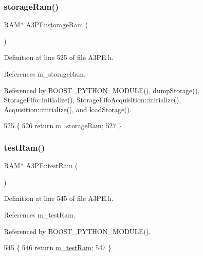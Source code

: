 \subsubsection{\texorpdfstring{storage\+Ram()}{storageRam()}}
{\footnotesize\ttfamily \hyperlink{classRAM}{R\+AM}$\ast$ A3\+P\+E\+::storage\+Ram (\begin{DoxyParamCaption}{ }\end{DoxyParamCaption})\hspace{0.3cm}{\ttfamily [inline]}}



Definition at line 525 of file A3\+P\+E.\+h.



References m\+\_\+storage\+Ram.



Referenced by B\+O\+O\+S\+T\+\_\+\+P\+Y\+T\+H\+O\+N\+\_\+\+M\+O\+D\+U\+L\+E(), dump\+Storage(), Storage\+Fifo\+::initialize(), Storage\+Fifo\+Acquisition\+::initialize(), Acquisition\+::initialize(), and load\+Storage().


\begin{DoxyCode}
525                    \{
526     \textcolor{keywordflow}{return} \hyperlink{classA3PE_a41e317474e0c6e63bad4648903279be9}{m\_storageRam};
527   \}
\end{DoxyCode}
\mbox{\label{classA3PE_a9327d0bd2efb5baa7c6b7de27bbc5997}} 
\subsubsection{\texorpdfstring{test\+Ram()}{testRam()}}
{\footnotesize\ttfamily \hyperlink{classRAM}{R\+AM}$\ast$ A3\+P\+E\+::test\+Ram (\begin{DoxyParamCaption}{ }\end{DoxyParamCaption})\hspace{0.3cm}{\ttfamily [inline]}}



Definition at line 545 of file A3\+P\+E.\+h.



References m\+\_\+test\+Ram.



Referenced by B\+O\+O\+S\+T\+\_\+\+P\+Y\+T\+H\+O\+N\+\_\+\+M\+O\+D\+U\+L\+E().


\begin{DoxyCode}
545                 \{
546     \textcolor{keywordflow}{return} \hyperlink{classA3PE_ad788e41ef5c674ab1a7671f3db0ffef6}{m\_testRam};
547   \}
\end{DoxyCode}
\mbox{\label{classObject_a73a0f1a41828fdd8303dd662446fb6c3}} 

